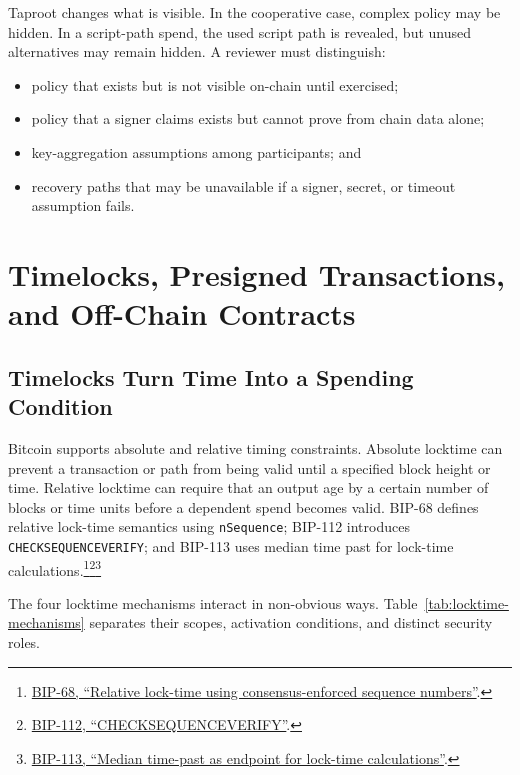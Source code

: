 Taproot changes what is visible. In the cooperative case, complex policy may be hidden. In a script-path spend, the used script path is revealed, but unused alternatives may remain hidden. A reviewer must distinguish:

\begin{itemize}
\item policy that exists but is not visible on-chain until exercised;
\item policy that a signer claims exists but cannot prove from chain data alone;
\item key-aggregation assumptions among participants; and
\item recovery paths that may be unavailable if a signer, secret, or timeout assumption fails.
\end{itemize}

\section{Timelocks, Presigned Transactions, and Off-Chain Contracts}

\subsection{Timelocks Turn Time Into a Spending Condition}

Bitcoin supports absolute and relative timing constraints. Absolute locktime can prevent a transaction or path from being valid until a specified block height or time. Relative locktime can require that an output age by a certain number of blocks or time units before a dependent spend becomes valid. BIP-68 defines relative lock-time semantics using \texttt{nSequence}; BIP-112 introduces \texttt{CHECKSEQUENCEVERIFY}; and BIP-113 uses median time past for lock-time calculations.\footnote{\href{https://bips.dev/68/}{BIP-68, ``Relative lock-time using consensus-enforced sequence numbers''}.}\footnote{\href{https://bips.dev/112/}{BIP-112, ``CHECKSEQUENCEVERIFY''}.}\footnote{\href{https://bips.dev/113/}{BIP-113, ``Median time-past as endpoint for lock-time calculations''}.}

The four locktime mechanisms interact in non-obvious ways. Table~\ref{tab:locktime-mechanisms} separates their scopes, activation conditions, and distinct security roles.

